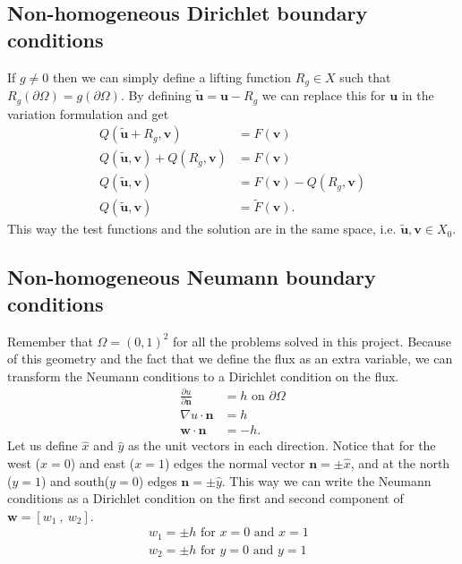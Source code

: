 \subsection{Non-homogeneous Dirichlet boundary conditions}
If $g \neq 0$ then we can simply define a lifting function $R_g \in X$ such that $R_g(\partial \Omega) = g(\partial \Omega)$. By defining $\tilde{\mathbf{u}}=\mathbf{u}-R_g$ we can replace this for $\mathbf{u}$ in the variation formulation and get 
\begin{align}
	Q(\tilde{\mathbf{u}}+R_g,\mathbf{v}) &= F(\mathbf{v}) \\
	Q(\tilde{\mathbf{u}},\mathbf{v})+Q(R_g,\mathbf{v}) &= F(\mathbf{v}) \\
	Q(\tilde{\mathbf{u}},\mathbf{v}) &= F(\mathbf{v}) - Q(R_g,\mathbf{v})\\
	Q(\tilde{\mathbf{u}},\mathbf{v}) &= \tilde{F}(\mathbf{v}).
	\label{eq:liftingFunc}
\end{align}
%
This way the test functions and the solution are in the same space, i.e. $\mathbf{\tilde u}, \mathbf{v} \in X_0$.
\subsection{Non-homogeneous Neumann boundary conditions}
Remember that $\Omega = (0,1)^2$ for all the problems solved in this project. Because of this geometry and the fact that we define the flux as an extra variable, we can transform the Neumann conditions to a Dirichlet condition on the flux. 
\begin{align}
	\frac{\partial u}{\partial \mathbf{n}} &= h \text{  on   } \partial \Omega \\
	\nabla u \cdot \mathbf{n} &= h \\
	 \mathbf{w} \cdot \mathbf{n} &= -h. 
	\label{eq:neumann}
\end{align}
Let us define $\hat{x}$ and $\hat{y}$ as the unit vectors in each direction. Notice that for the west ($x=0$) and east ($x=1$) edges the normal vector $\mathbf{n}= \pm\hat{x}$, and at the north ($y=1$) and south($y=0$) edges $\mathbf{n}=\pm \hat{y}$. This way we can write the Neumann conditions as a Dirichlet condition on the first and second component of $\mathbf{w}= [ w_1 \:,\: w_2]$. 
\begin{align}
	w_1 = \pm h \text{    for $x = 0$ and $x=1$ }\\
	w_2 = \pm h \text{    for $y = 0$ and $y=1$ }
	\label{eq:neumannAsDirichlet}
\end{align}
